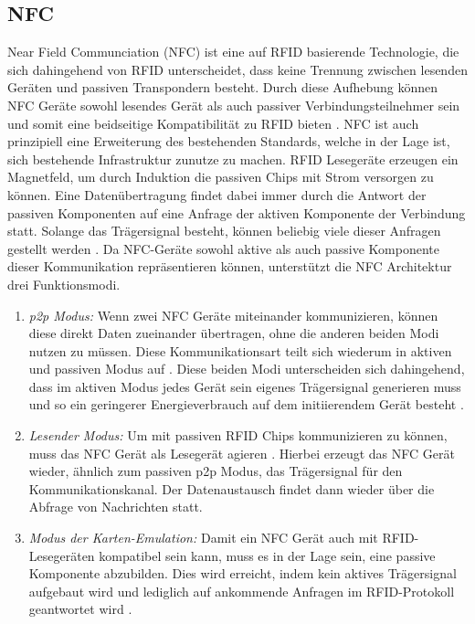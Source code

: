 	\subsection{NFC}
	Near Field Communciation (NFC) ist eine auf RFID basierende Technologie, die sich dahingehend von RFID unterscheidet, dass keine Trennung zwischen lesenden Geräten und passiven Transpondern besteht. Durch diese Aufhebung können NFC Geräte sowohl lesendes Gerät als auch passiver Verbindungsteilnehmer sein und somit eine beidseitige Kompatibilität zu RFID bieten \cite[S.6]{Langer}. NFC ist auch prinzipiell eine Erweiterung des bestehenden Standards, welche in der Lage ist, sich bestehende Infrastruktur zunutze zu machen.
	RFID Lesegeräte erzeugen ein Magnetfeld, um durch Induktion die passiven Chips mit Strom versorgen zu können. Eine Datenübertragung findet dabei immer durch die Antwort der passiven Komponenten auf eine Anfrage der aktiven Komponente der Verbindung statt. Solange das Trägersignal besteht, können beliebig viele dieser Anfragen gestellt werden \cite[S.89]{Langer}.
	Da NFC-Geräte sowohl aktive als auch passive Komponente dieser Kommunikation repräsentieren können, unterstützt die NFC Architektur drei Funktionsmodi.
	\begin{enumerate}
		\item {\it p2p Modus:} Wenn zwei NFC Geräte miteinander kommunizieren, können diese direkt Daten zueinander übertragen, ohne die anderen beiden Modi nutzen zu müssen. Diese Kommunikationsart teilt sich wiederum in aktiven und passiven Modus auf \cite[S.91]{Langer}. Diese beiden Modi unterscheiden sich dahingehend, dass im aktiven Modus jedes Gerät sein eigenes Trägersignal generieren muss und so ein geringerer Energieverbrauch auf dem initiierendem Gerät besteht \cite[S.94]{Langer}.
		
		\item {\it Lesender Modus:} Um mit passiven RFID Chips kommunizieren zu können, muss das NFC Gerät als Lesegerät agieren \cite[S.99]{Langer}. Hierbei erzeugt das NFC Gerät wieder, ähnlich zum passiven p2p Modus, das Trägersignal für den Kommunikationskanal. Der Datenaustausch findet dann wieder über die Abfrage von Nachrichten statt.
		\item {\it Modus der Karten-Emulation:} Damit ein NFC Gerät auch mit RFID-\linebreak Lesegeräten kompatibel sein kann, muss es in der Lage sein, eine passive Komponente abzubilden. Dies wird erreicht, indem kein aktives Trägersignal aufgebaut wird und lediglich auf ankommende Anfragen im RFID-Protokoll geantwortet wird \cite[S.100]{Langer}.
	\end{enumerate}
	
